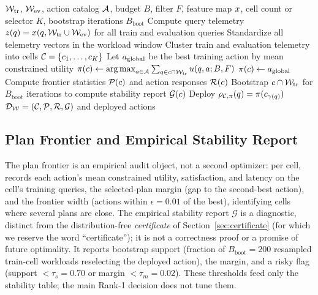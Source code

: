 \begin{algorithm}[t]
\caption{\WCR{}: risk-aware workload compilation (the exploratory regime). The certified variant \CWC{} replaces the single train set used in lines~7--8 by the selection/calibration split of Section~\ref{sec:protocol} so that Assumption~\ref{ass:cert}(iii) holds; all other steps are unchanged.}
\label{alg:wcr}
\begin{algorithmic}[1]
\REQUIRE $\mathcal{W}_{\mathrm{tr}}$, $\mathcal{W}_{\mathrm{ev}}$, action catalog $\mathcal{A}$, budget $B$, filter $F$, feature map $x$, cell count or selector $K$, bootstrap iterations $B_{\mathrm{boot}}$
\STATE Compute query telemetry $z(q)=x(q,\mathcal{W}_{\mathrm{tr}}\cup\mathcal{W}_{\mathrm{ev}})$ for all train and evaluation queries
\STATE Standardize all telemetry vectors in the workload window
\STATE Cluster train and evaluation telemetry into cells $\mathcal{C}=\{c_1,\ldots,c_K\}$
\STATE Let $a_{\mathrm{global}}$ be the best training action by mean constrained utility
    \STATE $\pi(c)\leftarrow\operatorname*{arg\,max}_{a\in\mathcal{A}}\sum_{q\in c\cap\mathcal{W}_{\mathrm{tr}}}u(q,a;B,F)$
  \ELSE
    \STATE $\pi(c)\leftarrow a_{\mathrm{global}}$
  \ENDIF
  \STATE Compute frontier statistics $\mathcal{P}(c)$ and action responses $\mathcal{R}(c)$
  \STATE Bootstrap $c\cap\mathcal{W}_{\mathrm{tr}}$ for $B_{\mathrm{boot}}$ iterations to compute stability report $\mathcal{G}(c)$
\ENDFOR
{}
  \STATE Deploy $\rho_{\mathcal{C},\pi}(q)=\pi(c_{\gamma(q)})$
\ENDFOR
\RETURN $\mathcal{D}_{\mathcal{W}}=(\mathcal{C},\mathcal{P},\mathcal{R},\mathcal{G})$ and deployed actions
\end{algorithmic}
\end{algorithm}

\subsection{Plan Frontier and Empirical Stability Report}
\label{subsec:frontier}

The plan frontier is an empirical audit object, not a second optimizer: per cell, \WCR{} records each action's mean constrained utility, satisfaction, and latency on the cell's training queries, the selected-plan margin (gap to the second-best action), and the frontier width (actions within $\epsilon{=}0.01$ of the best), identifying cells where several plans are close. The empirical stability report $\mathcal{G}$ is a diagnostic, distinct from the distribution-free \emph{certificate} of Section~\ref{sec:certificate} (for which we reserve the word ``certificate''); it is not a correctness proof or a promise of future optimality. It reports bootstrap support (fraction of $B_{\mathrm{boot}}{=}200$ resampled train-cell workloads reselecting the deployed action), the margin, and a risky flag (support $<\tau_s{=}0.70$ or margin $<\tau_m{=}0.02$). These thresholds feed only the stability table; the main Rank-1 decision does not tune them.

